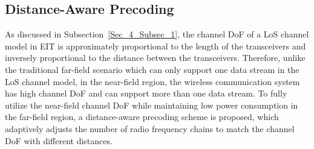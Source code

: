 \documentclass[journal,twocolumn]{IEEEtran}
\begin{document}
\subsection{Distance-Aware Precoding}
As discussed in Subsection~\ref{Sec_4_Subsec_1}, the channel DoF of a LoS channel model in EIT is approximately proportional to the length of the transceivers and inversely proportional to the distance between the transceivers. 
Therefore, unlike the traditional far-field scenario which can only support one data stream in the LoS channel model, in the near-field region, the wireless communication system has high channel DoF and can support more than one data stream.
To fully utilize the near-field channel DoF while maintaining low power consumption in the far-field region, a distance-aware precoding scheme is proposed, which adaptively adjusts the number of radio frequency chains to match the channel DoF with different distances.   


\end{document}
